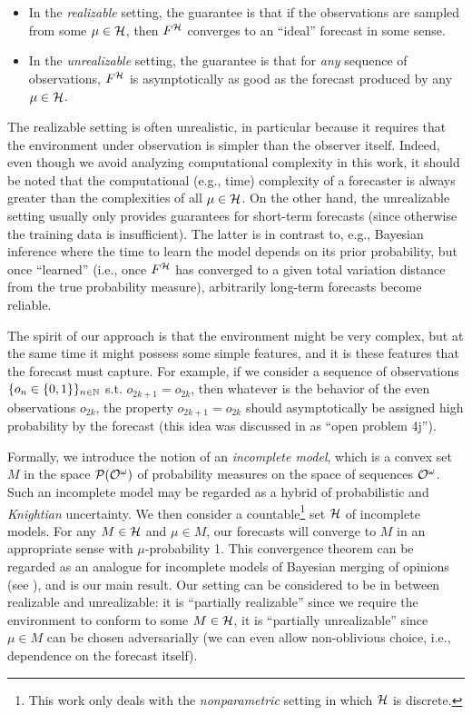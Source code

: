 \begin{itemize}
\item 
In the \emph{realizable} setting, the guarantee is that if the observations are sampled from some $\mu \in \mathcal{H}$, then $F^{\mathcal{H}}$ converges to an \enquote{ideal} forecast in some sense.
\item
In the \emph{unrealizable} setting, the guarantee is that for \emph{any} sequence of observations, $F^{\mathcal{H}}$ is asymptotically as good as the forecast produced by any $\mu \in \mathcal{H}$.
\end{itemize}

The realizable setting is often unrealistic, in particular because it requires that the environment under observation is simpler than the observer itself. Indeed, even though we avoid analyzing computational complexity in this work, it should be noted that the computational (e.g., time) complexity of a forecaster is always greater than the complexities of all $\mu \in \mathcal{H}$. On the other hand, the unrealizable setting usually only provides guarantees for short-term forecasts (since otherwise the training data is insufficient). The latter is in contrast to, e.g., Bayesian inference where the time to learn the model depends on its prior probability, but once \enquote{learned} (i.e., once $F^{\mathcal{H}}$ has converged to a given total variation distance from the true probability measure), arbitrarily long-term forecasts become reliable.

The spirit of our approach is that the environment might be very complex, but at the same time it might possess some simple features, and it is these features that the forecast must capture. For example, if we consider a sequence of observations $\{o_n \in \{0,1\}\}_{n \in \mathbb{N}}$ s.t. $o_{2k+1}=o_{2k}$, then whatever is the behavior of the even observations $o_{2k}$, the property $o_{2k+1}=o_{2k}$ should asymptotically be assigned high probability by the forecast (this idea was discussed in \cite{Hutter_2009} as \enquote{open problem 4j}).

Formally, we introduce the notion of an \emph{incomplete model}, which is a convex set $M$ in the space $\mathcal{P}(\mathcal{O}^\omega)$ of probability measures on the space of sequences $\mathcal{O}^\omega$. Such an incomplete model may be regarded as a hybrid of probabilistic and \emph{Knightian} uncertainty. We then consider a countable\footnote{This work only deals with the \emph{nonparametric} setting in which $\mathcal{H}$ is discrete.} set $\mathcal{H}$ of incomplete models. For any $M \in \mathcal{H}$ and $\mu \in M$, our forecasts will converge to $M$ in an appropriate sense with $\mu$-probability 1. This convergence theorem can be regarded as an analogue for incomplete models of Bayesian merging of opinions (see \cite{Blackwell_1962}), and is our main result. Our setting can be considered to be in between realizable and unrealizable: it is \enquote{partially realizable} since we require the environment to conform to some $M \in \mathcal{H}$, it is \enquote{partially unrealizable} since $\mu \in M$ can be chosen adversarially (we can even allow non-oblivious choice, i.e., dependence on the forecast itself).

